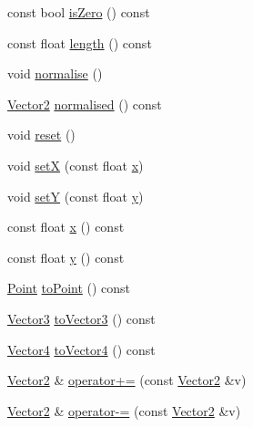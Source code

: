 \begin{DoxyCompactItemize}
\item 
const bool \hyperlink{classprism_1_1geometry_1_1_vector2_af37208c5f279b6ab1bd8a9e73665f156}{is\+Zero} () const 
\item 
const float \hyperlink{classprism_1_1geometry_1_1_vector2_a2317335bfed086a9998ed5a5915741f5}{length} () const 
\item 
void \hyperlink{classprism_1_1geometry_1_1_vector2_a723d69e0db962bdb54363e626140ba8a}{normalise} ()
\item 
\hyperlink{classprism_1_1geometry_1_1_vector2}{Vector2} \hyperlink{classprism_1_1geometry_1_1_vector2_a74b0110354a1d6ec3d3025ac3d36196c}{normalised} () const 
\item 
void \hyperlink{classprism_1_1geometry_1_1_vector2_a09d50a0f22f5465386ae325e788b1c87}{reset} ()
\item 
void \hyperlink{classprism_1_1geometry_1_1_vector2_aa83ee9b42bdb58835caf4d5c48fca60f}{setX} (const float \hyperlink{classprism_1_1geometry_1_1_vector2_a70e4ecc1edbd65a2a436da4ebb363bec}{x})
\item 
void \hyperlink{classprism_1_1geometry_1_1_vector2_afb72f100bf571d70fbe27625980ce72a}{setY} (const float \hyperlink{classprism_1_1geometry_1_1_vector2_a30579e6692e8074cf951ce37fef7f01a}{y})
\item 
const float \hyperlink{classprism_1_1geometry_1_1_vector2_a70e4ecc1edbd65a2a436da4ebb363bec}{x} () const 
\item 
const float \hyperlink{classprism_1_1geometry_1_1_vector2_a30579e6692e8074cf951ce37fef7f01a}{y} () const 
\item 
\hyperlink{classprism_1_1geometry_1_1_point}{Point} \hyperlink{classprism_1_1geometry_1_1_vector2_aab213e1cffe97069574d6ffd9828dabb}{to\+Point} () const 
\item 
\hyperlink{classprism_1_1geometry_1_1_vector3}{Vector3} \hyperlink{classprism_1_1geometry_1_1_vector2_a960ff4b193953712f425e61440d37a6c}{to\+Vector3} () const 
\item 
\hyperlink{classprism_1_1geometry_1_1_vector4}{Vector4} \hyperlink{classprism_1_1geometry_1_1_vector2_a4de3bc58d6778fa61a984e80d2ee7255}{to\+Vector4} () const 
\item 
\hyperlink{classprism_1_1geometry_1_1_vector2}{Vector2} \& \hyperlink{classprism_1_1geometry_1_1_vector2_a3b534df91eeb123befc850c4c2827c13}{operator+=} (const \hyperlink{classprism_1_1geometry_1_1_vector2}{Vector2} \&v)
\item 
\hyperlink{classprism_1_1geometry_1_1_vector2}{Vector2} \& \hyperlink{classprism_1_1geometry_1_1_vector2_acb133482e7bbdcdfa780033640697c41}{operator-\/=} (const \hyperlink{classprism_1_1geometry_1_1_vector2}{Vector2} \&v)

\end{DoxyCompactItemize}
